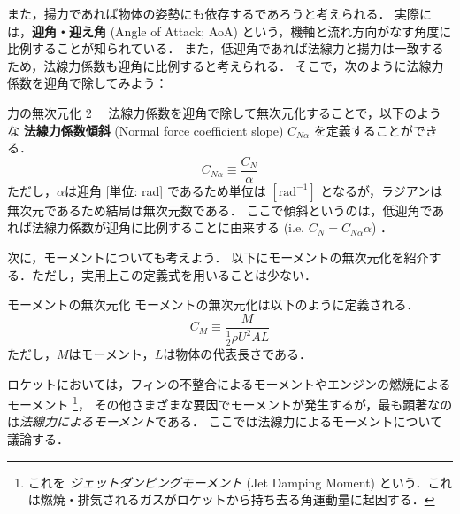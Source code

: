 \documentclass[uplatex,dvipdfmx,a4j,11pt]{jsreport}
\newcommand{\keyword}[1]{\textcolor{mainblue}{\textbf{#1}}}
\numberwithin{equation}{chapter}
\begin{document}
また，揚力であれば物体の姿勢にも依存するであろうと考えられる．
実際には，\keyword{迎角・迎え角} (Angle of Attack; AoA) という，機軸と流れ方向がなす角度に比例することが知られている．
また，低迎角であれば法線力と揚力は一致するため，法線力係数も迎角に比例すると考えられる．
そこで，次のように法線力係数を迎角で除してみよう：
\begin{definition}{力の無次元化 2}{}{}
  　法線力係数を迎角で除して無次元化することで，以下のような \keyword{法線力係数傾斜} (Normal force coefficient slope) $C_{N\alpha}$ を定義することができる．
    \begin{equation}
      C_{N\alpha} \equiv \frac{C_{N}}{\alpha}
    \end{equation}
  ただし，$\alpha$は迎角 [単位: rad] であるため単位は $[\mathrm{rad}^{-1}]$ となるが，ラジアンは無次元であるため結局は無次元数である．
  ここで傾斜というのは，低迎角であれば法線力係数が迎角に比例することに由来する (i.e. $C_N = C_{N\alpha} \alpha$) ．
\end{definition}

\enskip

次に，モーメントについても考えよう．
以下にモーメントの無次元化を紹介する．ただし，実用上この定義式を用いることは少ない．
\begin{definition}{モーメントの無次元化}{}{}
  モーメントの無次元化は以下のように定義される．
    \begin{equation}
      C_M \equiv \frac{M}{\frac{1}{2}\rho U^{2}A L}
    \end{equation}
  ただし，$M$はモーメント，$L$は物体の代表長さである．
\end{definition}

ロケットにおいては，フィンの不整合によるモーメントやエンジンの燃焼によるモーメント
\footnote{これを \emph{ジェットダンピングモーメント} (Jet Damping Moment) という．これは燃焼・排気されるガスがロケットから持ち去る角運動量に起因する．}，
その他さまざまな要因でモーメントが発生するが，最も顕著なのは\emph{法線力によるモーメント}である．
ここでは法線力によるモーメントについて議論する．
\end{document}
